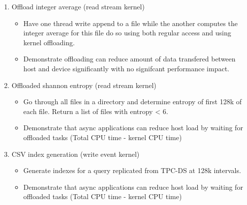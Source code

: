 \begin{enumerate}
    \item Offload integer average (read stream kernel)
    \begin{itemize}
        \item Have one thread write append to a file while the another computes
              the integer average for this file do so using both regular access
              and using kernel offloading.
        \item Demonstrate offloading can reduce amount of data transfered
              between host and device significantly with no signifcant
              performance impact.
    \end{itemize}
    \item Offloaded shannon entropy (read stream kernel)
    \begin{itemize}
        \item Go through all files in a directory and determine entropy of first
              128k of each file. Return a list of files with entropy < 6.
        \item Demonstrate that async applications can reduce host load by
              waiting for offloaded tasks (Total CPU time - kernel CPU time)
    \end{itemize}
    \item CSV index generation (write event kernel)
    \begin{itemize}
        \item Generate indexes for a query replicated from TPC-DS at 128k
              intervals.
        \item Demonstrate that async applications can reduce host load by
              waiting for offloaded tasks (Total CPU time - kernel CPU time)
    \end{itemize}
\end{enumerate}


